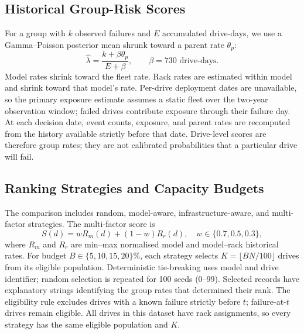\documentclass[conference]{IEEEtran}
\begin{document}
\subsection{Historical Group-Risk Scores}
For a group with $k$ observed failures and $E$ accumulated drive-days, we use a
Gamma--Poisson posterior mean shrunk toward a parent rate $\theta_p$:
\begin{equation}
 \widehat{\lambda}=\frac{k+\beta\theta_p}{E+\beta},\qquad \beta=730\text{ drive-days}.
\end{equation}
Model rates shrink toward the fleet rate. Rack rates are estimated within model and
shrink toward that model's rate. Per-drive deployment dates are unavailable, so the
primary exposure estimate assumes a static fleet over the two-year observation window;
failed drives contribute exposure through their failure day. At each decision date,
event counts, exposure, and parent rates are recomputed from the history available
strictly before that date.
Drive-level scores are therefore group rates; they are not calibrated probabilities
that a particular drive will fail.

\subsection{Ranking Strategies and Capacity Budgets}
The comparison includes random, model-aware, infrastructure-aware, and multi-factor
strategies. The multi-factor score is
\begin{equation}
 S(d)=wR_m(d)+(1-w)R_r(d),\quad w\in\{0.7,0.5,0.3\},
\end{equation}
where $R_m$ and $R_r$ are min--max normalised model and model--rack historical rates.
For budget $B\in\{5,10,15,20\}\%$, each strategy selects
$K=\lfloor BN/100\rfloor$ drives from its eligible population. Deterministic
tie-breaking uses model and drive identifier; random selection is repeated for 100
seeds (0--99). Selected records have explanatory strings identifying the group rates
that determined their rank. The eligibility rule excludes drives with a known failure
strictly before $t$; failure-at-$t$ drives remain eligible. All drives in this dataset
have rack assignments, so every strategy has the same eligible population and $K$.
\end{document}
